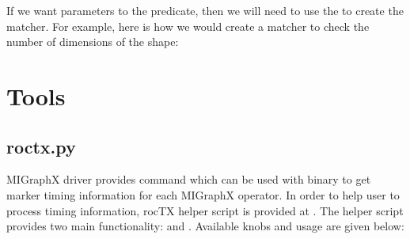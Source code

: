 \documentclass[letterpaper,10pt,english]{sphinxmanual}
\begin{document}
\sphinxAtStartPar
If we want parameters to the predicate, then we will need to use the  to create the matcher. For example, here is how we would create a matcher to check the number of dimensions of the shape:

\begin{sphinxVerbatim}[commandchars=\\\{\}]
\PYG{p}{[}\PYG{p}{]}
\end{sphinxVerbatim}


\section{Tools}
\label{\detokenize{dev/tools:tools}}\label{\detokenize{dev/tools::doc}}

\subsection{roctx.py}
\label{\detokenize{dev/tools:roctx-py}}
\sphinxAtStartPar
MIGraphX driver provides  command which can be used with  binary to get marker timing information for each MIGraphX operator.
In order to help user to process timing information, rocTX helper script is provided at .
The  helper script provides two main functionality:  and . Available knobs and usage are given below:
\end{document}
